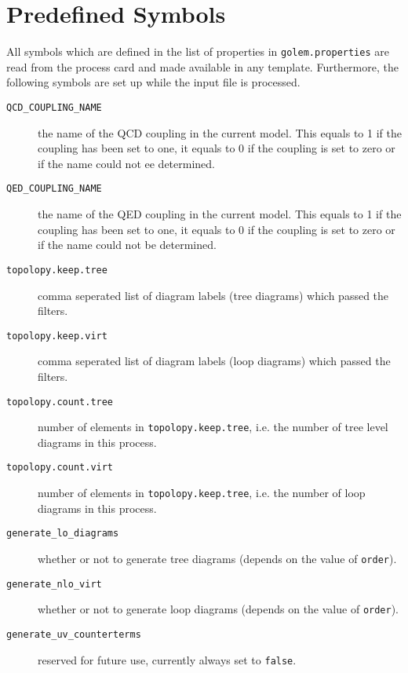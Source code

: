 \documentclass[11pt,a4paper]{refrep}
\begin{document}
\section{Predefined Symbols}
All symbols which are defined in the list of properties
in \texttt{golem.properties} are read from the process card and
made available in any template. Furthermore, the following symbols
are set up while the input file is processed.
\begin{description}
\item[\texttt{QCD\_COUPLING\_NAME}] the name of the QCD coupling in the
current model. This equals to 1 if the coupling has been set to one,
it equals to 0 if the coupling is set to zero or if the name could not
ee determined.
\item[\texttt{QED\_COUPLING\_NAME}] the name of the QED coupling in the
current model. This equals to 1 if the coupling has been set to one,
it equals to 0 if the coupling is set to zero or if the name could not
be determined.
\item[\texttt{topolopy.keep.tree}] comma seperated list of diagram labels
(tree diagrams) which passed the filters.
\item[\texttt{topolopy.keep.virt}] comma seperated list of diagram labels
(loop diagrams) which passed the filters.
\item[\texttt{topolopy.count.tree}] number of elements in
\texttt{topolopy.keep.tree}, i.e. the number of tree level diagrams in this
process.
\item[\texttt{topolopy.count.virt}] number of elements in
\texttt{topolopy.keep.tree}, i.e. the number of loop diagrams in this
process.
\item[\texttt{generate\_lo\_diagrams}] whether or not to generate tree
diagrams (depends on the value of \texttt{order}).
\item[\texttt{generate\_nlo\_virt}] whether or not to generate loop
diagrams (depends on the value of \texttt{order}).
\item[\texttt{generate\_uv\_counterterms}] reserved for future use,
currently always set to \texttt{false}.
\end{description}
\bigskip
\end{document}
